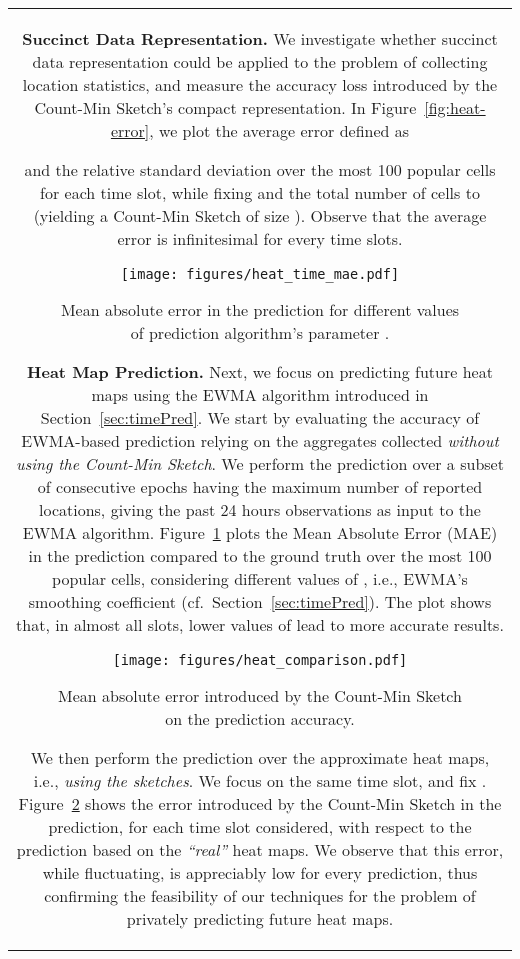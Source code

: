 \documentclass[conference]{IEEEtran}
\newcommand{\descr}[1]{\medskip \noindent \textbf{#1}}
\begin{document}
\begin{figure*}[ht!]
{\begin{tabular}{|c|}
\descr{Succinct Data Representation.} We investigate whether succinct data representation could be applied to the problem of collecting location statistics, and measure the accuracy loss introduced by the Count-Min Sketch's compact representation. In Figure~\ref{fig:heat-error}, we plot the average error defined as

and the relative standard deviation over the most 100 popular cells for each time slot, while fixing  
and the total number of cells to  (yielding a Count-Min Sketch of size ).
Observe that the average error is infinitesimal for every time slots.

\begin{figure}[t]
\centering
\texttt{[image: figures/heat\_time\_mae.pdf]}
\vspace{-0.1cm}
\caption{\label{fig:heat-pred} Mean absolute error in the prediction for different values of prediction algorithm's parameter .}
\vspace{-0.15cm}
\end{figure}

\descr{Heat Map Prediction.} Next, we focus on predicting future heat maps using the EWMA algorithm introduced in Section~\ref{sec:timePred}. We start by evaluating the accuracy of EWMA-based prediction relying on the aggregates collected {\em without using the Count-Min Sketch}. We perform the prediction over a subset of  consecutive epochs having the maximum number of reported locations, giving the past 24 hours observations as input to the EWMA algorithm.
Figure~\ref{fig:heat-pred} plots the Mean Absolute Error (MAE) in the prediction compared to the ground truth over the most 100 popular cells, considering different values of 
, i.e., EWMA's smoothing coefficient (cf.~Section~\ref{sec:timePred}).
The plot shows that, in almost all slots, lower values of  lead to more accurate results. 
\begin{figure}[t]
\centering
\texttt{[image: figures/heat\_comparison.pdf]}
\vspace{-0.1cm}
\caption{\label{fig:heat-comp} Mean absolute error introduced by the Count-Min Sketch on the prediction accuracy.}
\vspace{-0.45cm}
\end{figure}

We then perform the prediction over the approximate heat maps, i.e., {\em using the sketches}. We focus on the same time slot, and fix .
Figure~\ref{fig:heat-comp} shows the error introduced by the Count-Min Sketch in the prediction, for each time slot considered, with respect to the prediction based on the {\em ``real''} heat maps. 
We observe that this error, while fluctuating, is appreciably low for every prediction, thus confirming the feasibility of our techniques for the problem of privately predicting future heat maps.


\end{tabular}}
\end{figure*}
\end{document}
